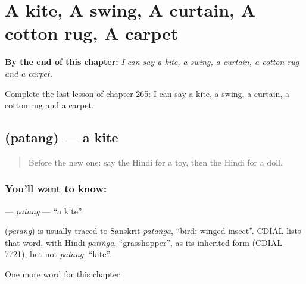 
\chapter{A kite, A swing, A curtain, A cotton rug, A carpet}
\label{ch:hi-a-kite-a-swing-a-curtain-a-cotton-rug-a-carpet}

\begin{chapteropening}
\textbf{By the end of this chapter:} \emph{I can say a kite, a swing, a curtain, a cotton rug and a carpet.}

Complete the last lesson of chapter 265: I can say a kite, a swing, a curtain, a cotton rug and a carpet.
\end{chapteropening}

\section[\texorpdfstring{\hi{पतंग} (patang)}{पतंग (patang)}]{ (patang) — a kite}

\label{lesson:HI-C265-patang}



\begin{quote}
Before the new one: say the Hindi for a toy, then the Hindi for a doll.
\end{quote}

\subsection*{You'll want to know: }
\textbf{} — \emph{patang} — \textquotedblleft{}a kite\textquotedblright{}.

\begin{cousinweb}
\textbf{} (\emph{patang}) is usually traced to Sanskrit \emph{pataṅga}, \textquotedblleft{}bird; winged insect\textquotedblright{}. CDIAL lists that word, with Hindi \emph{patiṅgā}, \textquotedblleft{}grasshopper\textquotedblright{}, as its inherited form (CDIAL 7721), but not \emph{patang}, \textquotedblleft{}kite\textquotedblright{}.
\end{cousinweb}

\begin{grammarlens}[title={What you've built}]
One more word for this chapter.
\end{grammarlens}

